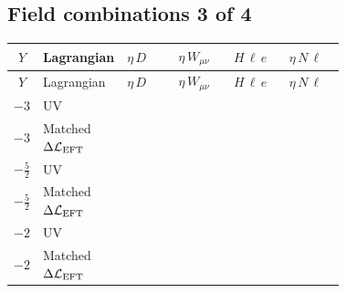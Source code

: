 \documentclass[8pt]{article}
\begin{document}
\begin{landscape}
\subsection*{Field combinations 3 of 4}
\begin{longtable}{@{}c l >{\raggedright\arraybackslash}p{0.18\linewidth} >{\raggedright\arraybackslash}p{0.18\linewidth} >{\raggedright\arraybackslash}p{0.18\linewidth} >{\raggedright\arraybackslash}p{0.18\linewidth}@{}}
\toprule
$Y$ & Lagrangian & $\eta\,D$ & $\eta\,W_{\mu\nu}$ & $H\,\ell\,e$ & $\eta\,N\,\ell$ \\
\midrule
\endfirsthead
\toprule
$Y$ & Lagrangian & $\eta\,D$ & $\eta\,W_{\mu\nu}$ & $H\,\ell\,e$ & $\eta\,N\,\ell$ \\
\midrule
\endhead
$-3$ & UV & \scriptsize\adjustbox{max width=\linewidth}{$\begin{gathered} +D_{\mu _1}\left(\eta _{a_1}\right) D_{\mu _1}\left(\eta _{a_1}\right){}^{\dagger }\end{gathered}$} &  &  &  \\
\midrule
$-3$ & Matched $\Delta\mathcal{L}_{\rm EFT}$ &  & \scriptsize\adjustbox{max width=\linewidth}{$\begin{gathered} -\frac{1}{24} \hbar  \log \left(\frac{\text{$\mu $bar2}}{M_{\eta }^2}\right) \left(W_{\mu _1\mu _2}^{A_1}\right){}^2\end{gathered}$} &  &  \\
\midrule
$-\frac{5}{2}$ & UV & \scriptsize\adjustbox{max width=\linewidth}{$\begin{gathered} +D_{\mu _1}\left(\eta _{a_1}\right) D_{\mu _1}\left(\eta _{a_1}\right){}^{\dagger }\end{gathered}$} &  &  &  \\
\midrule
$-\frac{5}{2}$ & Matched $\Delta\mathcal{L}_{\rm EFT}$ &  & \scriptsize\adjustbox{max width=\linewidth}{$\begin{gathered} -\frac{1}{24} \hbar  \log \left(\frac{\text{$\mu $bar2}}{M_{\eta }^2}\right) \left(W_{\mu _1\mu _2}^{A_1}\right){}^2\end{gathered}$} &  &  \\
\midrule
$-2$ & UV & \scriptsize\adjustbox{max width=\linewidth}{$\begin{gathered} +D_{\mu _1}\left(\eta _{a_1}\right) D_{\mu _1}\left(\eta _{a_1}\right){}^{\dagger }\end{gathered}$} &  &  &  \\
\midrule
$-2$ & Matched $\Delta\mathcal{L}_{\rm EFT}$ &  & \scriptsize\adjustbox{max width=\linewidth}{$\begin{gathered} -\frac{1}{24} \hbar  \log \left(\frac{\text{$\mu $bar2}}{M_{\eta }^2}\right) \left(W_{\mu _1\mu _2}^{A_1}\right){}^2\end{gathered}$} &  &  \\

\end{longtable}
\end{landscape}
\end{document}
